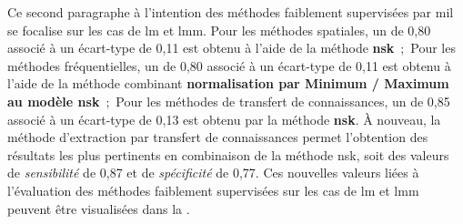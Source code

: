 Ce second paragraphe à l'intention des méthodes faiblement supervisées par \gls{mil} se focalise sur les cas de \gls{lm} et \gls{lmm}. Pour les méthodes spatiales, un \fscore{} de 0,80 associé à un écart-type de 0,11 est obtenu à l'aide de la méthode \textbf{\gls{nsk}}~;~Pour les méthodes fréquentielles, un \fscore{} de 0,80 associé à un écart-type de 0,11 est obtenu à l'aide de la méthode combinant \textbf{normalisation par Minimum / Maximum au modèle \gls{nsk}}~;~Pour les méthodes de transfert de connaissances, un \fscore{} de 0,85 associé à un écart-type de 0,13 est obtenu par la méthode \textbf{\gls{nsk}}. À nouveau, la méthode d'extraction par transfert de connaissances permet l'obtention des résultats les plus pertinents en combinaison de la méthode \gls{nsk}, soit des valeurs de \textit{sensibilité} de 0,87 et de \textit{spécificité} de 0,77. Ces nouvelles valeurs liées à l'évaluation des méthodes faiblement supervisées sur les cas de \gls{lm} et \gls{lmm} peuvent être visualisées dans la .\par

